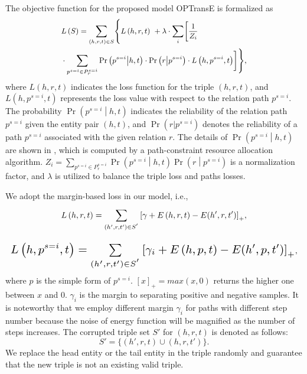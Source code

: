 \documentclass[11pt,a4paper]{article}
\begin{document}
The objective function for the proposed model OPTransE is formalized
as
\begin{equation}\small
\begin{split}
 & L\left( S \right) =
 \sum_{\left( h,r,t \right) \in S}^{}\Biggl\{ L\left( h,r,t \right)\  + \lambda \cdot \sum_{i}^{}
 \biggl[\frac{1}{Z_{i}} \\
& \cdot\sum_{p^{s=i} \in P^{s=i}_{r}}^{}\Pr\left( p^{s=i} \middle| h,t
\right) \cdot \Pr\left( r \middle| p^{s=i} \right)
 \cdot L\left( h,p^{s=i},t \right)\biggr]\Biggr\},
\end{split}
\label{obj}
\end{equation}
where \(L\left( h,r,t \right)\) indicates the loss function for the
triple $(h,r,t)$, and \(L\left( h,p^{s=i},t \right)\) represents the
loss value with respect to the relation path \(p^{s=i}\). The
probability \(\Pr\left( p^{s=i} \middle| h,t \right)\) indicates the
reliability of the relation path \(p^{s=i}\) given the entity pair
$(h,t)$, and \(\Pr(r|p^{s=i})\) denotes the reliability of a path
\(p^{s=i}\) associated with the given relation ${r}$. The details of \(\Pr\left( p^{s=i} \middle| h,t \right)\)  are shown in \cite{lin2015modeling}, which is computed by a path-constraint resource allocation algorithm. \(Z_{i} =
\sum_{p^{s=i} \in P^{s=i}_{r}}^{}{\Pr\left( p^{s=i} \middle| h,t
\right)\Pr\left( r \middle| p^{s=i} \right)}\) is a normalization
factor, and \(\lambda\) is utilized to balance the triple loss and
paths losses.

We adopt the margin-based loss in our model, i.e.,
\begin{equation}\small
L\left( h,r,t \right) = \sum_{(h{'},r,t{'}) \in
S^{'}}^{}{\lbrack\gamma+E\left( h,r,t \right)-
E(h{'},r,t{'})\rbrack}_{+},
\end{equation}

\begin{equation}\small
\resizebox{1\linewidth}{!}{$ L\left( h,p^{s=i},t \right) =
\sum\limits_{(h{'},r,t{'}) \in S^{'}}^{}{\lbrack\gamma_{i}+ E\left(
h,p,t \right)- E(h{'},p,t{'})\rbrack}_{+}$},
\end{equation}
where $p$ is the simple form of $p^{s=i}$. \(\left\lbrack x
\right\rbrack_{+} = max(x,0)\) returns the higher one between $x$
and 0. \(\gamma_{i}\) is the margin to separating positive and
negative samples. It is noteworthy that we employ different margin
\(\gamma_{i}\) for paths with different step number because the
noise of energy function will be magnified as the number of steps
increases. The corrupted triple set $S{'}$ for $(h,r,t)$ is denoted
as follows:
\begin{equation}
S{'} = \{(h',r,t) \cup(h,r,t')\}.
\end{equation}
We replace the head entity or the tail entity in the triple randomly
and guarantee that the new triple is not an existing valid triple.
\end{document}
